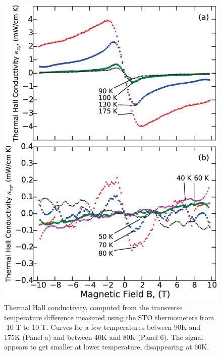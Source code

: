 \documentclass{thesis-umich}
\begin{document}
\begin{figure} \centering \caption[Thermal Hall Conductivity of Bismuth]{Thermal Hall conductivity, computed from the
    transverse temperature difference measured using the STO thermometers from
    -10 T to 10 T. Curves for a few temperatures between 90K and 175K (Panel a)
    and between 40K and 80K (Panel 6). The signal appears to get smaller at
lower temperature, disappearing at 60K.} \label{fig:kappaxy}
\centering
\includegraphics[width=0.85\columnwidth]{figures/kappaxy_apl.eps} \end{figure}
\end{document}
